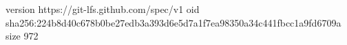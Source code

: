 version https://git-lfs.github.com/spec/v1
oid sha256:224b8d40c678b0be27edb3a393d6e5d7a1f7ea98350a34c441fbcc1a9fd6709a
size 972
